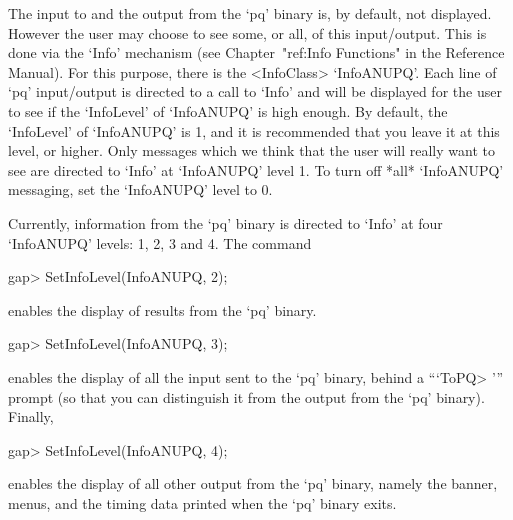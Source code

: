 The input to and the output from the `pq'  binary  is,  by  default,  not
displayed. However the user may choose to  see  some,  or  all,  of  this
input/output.   This   is   done   via   the   `Info'   mechanism    (see
Chapter~"ref:Info Functions" in the {\GAP} Reference  Manual).  For  this
purpose,  there  is  the  <InfoClass>  `InfoANUPQ'.  Each  line  of  `pq'
input/output is directed to a call to `Info' and will  be  displayed  for
the user to see if the `InfoLevel' of  `InfoANUPQ'  is  high  enough.  By
default, the `InfoLevel' of `InfoANUPQ' is 1, and it is recommended  that
you leave it at this level, or higher. Only messages which we think  that
the user will really want to see are directed to  `Info'  at  `InfoANUPQ'
level 1. To turn off *all* `InfoANUPQ'  messaging,  set  the  `InfoANUPQ'
level to 0.

Currently, information from the `pq' binary is directed to `Info' at four
`InfoANUPQ' levels: 1, 2, 3 and 4. The command

\beginexample
gap> SetInfoLevel(InfoANUPQ, 2);
\endexample

enables the display of results from the `pq'  binary.

\beginexample
gap> SetInfoLevel(InfoANUPQ, 3);
\endexample

enables the display of all the input sent to the `pq'  binary,  behind  a
```ToPQ> ''' prompt (so that you can distinguish it from the output  from
the `pq' binary). Finally,

\beginexample
gap> SetInfoLevel(InfoANUPQ, 4);
\endexample

enables the display of all other output from the `pq' binary, namely  the
banner, menus, and the timing data printed when the `pq' binary exits.

